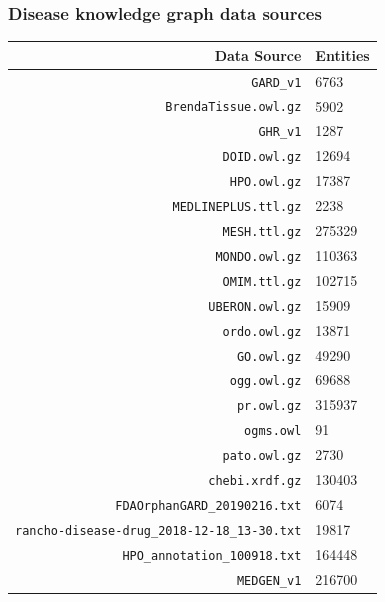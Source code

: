 ﻿\documentclass[anchorcolor=blue,linkcolor=blue]{beamer}
\begin{document}
\begin{frame}
  \frametitle{Disease knowledge graph data sources}
  \begin{center}
    \tiny
    \begin{tabular}{rl}\toprule
      Data Source & Entities\\ \midrule
      \texttt{GARD\_v1}&6763\\
      \texttt{BrendaTissue.owl.gz}&5902\\
      \texttt{GHR\_v1}&1287\\
      \texttt{DOID.owl.gz}&12694\\
      \texttt{HPO.owl.gz}&17387\\
      \texttt{MEDLINEPLUS.ttl.gz}&2238\\
      \texttt{MESH.ttl.gz}&275329\\
      \texttt{MONDO.owl.gz}&110363\\
      \texttt{OMIM.ttl.gz}&102715\\
      \texttt{UBERON.owl.gz}&15909\\
      \texttt{ordo.owl.gz}&13871\\
      \texttt{GO.owl.gz}&49290\\
      \texttt{ogg.owl.gz}&69688\\
      \texttt{pr.owl.gz}&315937\\
      \texttt{ogms.owl}&91\\
      \texttt{pato.owl.gz}&2730\\
      \texttt{chebi.xrdf.gz}&130403\\
      \texttt{FDAOrphanGARD\_20190216.txt}&6074\\
      \texttt{rancho-disease-drug\_2018-12-18\_13-30.txt}&19817\\
      \texttt{HPO\_annotation\_100918.txt}&164448\\
      \texttt{MEDGEN\_v1} &216700\\ \bottomrule
    \end{tabular}
  \end{center}
\end{frame}
\end{document}
